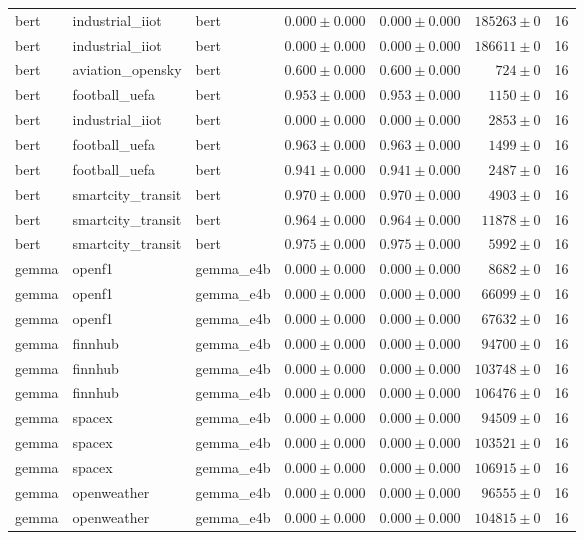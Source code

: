 \begin{table}[htbp]
\begin{tabular}{l l l r r r r}
bert & industrial\_iiot & bert & $0.000\pm0.000$ & $0.000\pm0.000$ & $185263\pm0$ & 16 \\
bert & industrial\_iiot & bert & $0.000\pm0.000$ & $0.000\pm0.000$ & $186611\pm0$ & 16 \\
bert & aviation\_opensky & bert & $0.600\pm0.000$ & $0.600\pm0.000$ & $724\pm0$ & 16 \\
bert & football\_uefa & bert & $0.953\pm0.000$ & $0.953\pm0.000$ & $1150\pm0$ & 16 \\
bert & industrial\_iiot & bert & $0.000\pm0.000$ & $0.000\pm0.000$ & $2853\pm0$ & 16 \\
bert & football\_uefa & bert & $0.963\pm0.000$ & $0.963\pm0.000$ & $1499\pm0$ & 16 \\
bert & football\_uefa & bert & $0.941\pm0.000$ & $0.941\pm0.000$ & $2487\pm0$ & 16 \\
bert & smartcity\_transit & bert & $0.970\pm0.000$ & $0.970\pm0.000$ & $4903\pm0$ & 16 \\
bert & smartcity\_transit & bert & $0.964\pm0.000$ & $0.964\pm0.000$ & $11878\pm0$ & 16 \\
bert & smartcity\_transit & bert & $0.975\pm0.000$ & $0.975\pm0.000$ & $5992\pm0$ & 16 \\
gemma & openf1 & gemma\_e4b & $0.000\pm0.000$ & $0.000\pm0.000$ & $8682\pm0$ & 16 \\
gemma & openf1 & gemma\_e4b & $0.000\pm0.000$ & $0.000\pm0.000$ & $66099\pm0$ & 16 \\
gemma & openf1 & gemma\_e4b & $0.000\pm0.000$ & $0.000\pm0.000$ & $67632\pm0$ & 16 \\
gemma & finnhub & gemma\_e4b & $0.000\pm0.000$ & $0.000\pm0.000$ & $94700\pm0$ & 16 \\
gemma & finnhub & gemma\_e4b & $0.000\pm0.000$ & $0.000\pm0.000$ & $103748\pm0$ & 16 \\
gemma & finnhub & gemma\_e4b & $0.000\pm0.000$ & $0.000\pm0.000$ & $106476\pm0$ & 16 \\
gemma & spacex & gemma\_e4b & $0.000\pm0.000$ & $0.000\pm0.000$ & $94509\pm0$ & 16 \\
gemma & spacex & gemma\_e4b & $0.000\pm0.000$ & $0.000\pm0.000$ & $103521\pm0$ & 16 \\
gemma & spacex & gemma\_e4b & $0.000\pm0.000$ & $0.000\pm0.000$ & $106915\pm0$ & 16 \\
gemma & openweather & gemma\_e4b & $0.000\pm0.000$ & $0.000\pm0.000$ & $96555\pm0$ & 16 \\
gemma & openweather & gemma\_e4b & $0.000\pm0.000$ & $0.000\pm0.000$ & $104815\pm0$ & 16 \\

\end{tabular}
\end{table}
